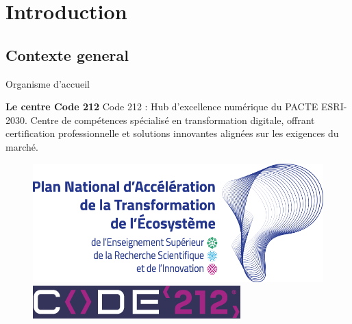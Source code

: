 \section{Introduction}

\subsection{Contexte general}

\begin{frame}{Organisme d'accueil}

    \vspace{0.5cm} %
    \begin{block}{\centering \textbf{\Large Le centre Code 212}}
        \centering
        \vspace{0.2cm} %
        Code 212 : Hub d'excellence numérique du PACTE ESRI-2030. Centre de compétences spécialisé en transformation digitale, offrant certification professionnelle et solutions innovantes alignées sur les exigences du marché.
    \end{block}

    \begin{figure}[H]
        \centering
        \begin{minipage}[b]{0.45\linewidth}
            \centering
            
            \includegraphics[width=\linewidth]{assets/images/esri.png}
        \end{minipage}
        \begin{minipage}[b]{0.45\linewidth}
            \centering
            \includegraphics[width=\linewidth]{assets/images/code.png}
        \end{minipage}
    \end{figure}
\end{frame}


